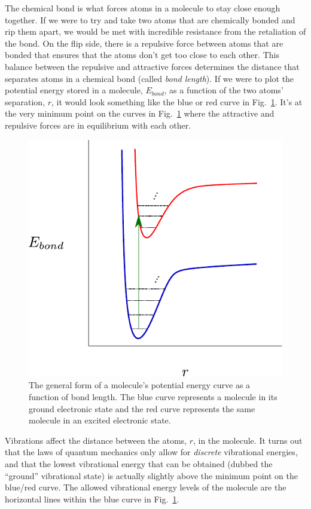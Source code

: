 \documentclass[12pt]{article}
\begin{document}
The chemical bond is what forces atoms in a molecule to stay close enough together. If we were to try and take two atoms that are chemically bonded and rip them apart, we would be met with incredible resistance from the retaliation of the bond. On the flip side, there is a repulsive force between atoms that are bonded that ensures that the atoms don't get too close to each other. This balance between the repulsive and attractive forces determines the distance that separates atoms in a chemical bond (called \textit{bond length}). If we were to plot the potential energy stored in a molecule, $E_{bond}$, as a function of the two atoms' separation, $r$, it would look something like the blue or red curve in Fig.~\ref{fig:potential_curve}. It's at the very minimum point on the curves in Fig.~\ref{fig:potential_curve} where the attractive and repulsive forces are in equilibrium with each other.

\begin{figure}
    \begin{center}
        \includegraphics[width=0.4\linewidth]{figures/potential_energy_curve.pdf}
    \end{center}
    \caption{
    The general form of a molecule's potential energy curve as a function of bond length. The blue curve represents a molecule in its ground electronic state and the red curve represents the same molecule in an excited electronic state.
    }
    \label{fig:potential_curve}
\end{figure}

Vibrations affect the distance between the atoms, $r$, in the molecule. It turns out that the laws of quantum mechanics only allow for \textit{discrete} vibrational energies, and that the lowest vibrational energy that can be obtained (dubbed the ``ground'' vibrational state) is actually slightly above the minimum point on the blue/red curve. The allowed vibrational energy levels of the molecule are the horizontal lines within the blue curve in Fig.~\ref{fig:potential_curve}.
\end{document}
